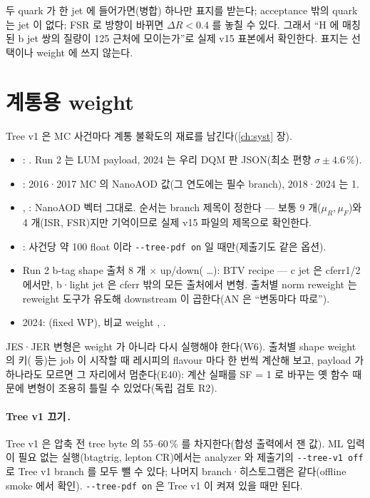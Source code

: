 \begin{note}[표지의 한계]
두 quark 가 한 jet 에 들어가면(병합) 하나만 표지를 받는다; acceptance 밖의 quark 는 jet 이 없다; FSR 로 방향이 바뀌면 $\Delta R<0.4$ 를 놓칠 수 있다.
그래서 ``H 에 매칭된 b jet 쌍의 질량이 125\GeV{} 근처에 모이는가''로 실제 v15 표본에서 확인한다. 표지는 선택이나 weight 에
쓰지 않는다.
\end{note}

\section{계통용 weight}\label{sec:reco-weights}
Tree v1 은 MC 사건마다 계통 불확도의 재료를 남긴다(\ref{ch:syst} 장).
\begin{itemize}
\item {}: . Run 2 는 LUM payload, 2024 는 우리 DQM 판 JSON(최소 편향 $\sigma\pm4.6\,\%$).
\item {}: 2016·2017 MC 의 NanoAOD 값(그 연도에는 필수 branch), 2018·2024 는 1.
\item {}, : NanoAOD 벡터 그대로. 순서는 branch 제목이 정한다 — 보통 9 개($\mu_R,\mu_F$)와 4 개(ISR, FSR)지만 기억이므로
      실제 v15 파일의 제목으로 확인한다\tagopen.
\item {}: 사건당 약 100 float 이라 \texttt{-{}-tree-pdf on} 일 때만(제출기도 같은 옵션).
\item Run 2 b-tag shape 출처 8 개 $\times$ up/down( …): BTV recipe — c jet 은 cferr1/2 에서만, b·light jet 은 cferr 밖의 모든 출처에서
      변형. 출처별 norm reweight 는 reweight 도구가 유도해 downstream 이 곱한다(AN 은 ``변동마다 따로'').
\item 2024: (fixed WP), 비교 weight , .
\end{itemize}
JES·JER 변형은 weight 가 아니라 다시 실행해야 한다(W6). 출처별 shape weight 의 키( 등)는 job 이 시작할 때 레시피의
flavour 마다 한 번씩 계산해 보고, payload 가 하나라도 모르면 그 자리에서 멈춘다(E40)\tagtest{}: 계산 실패를 SF = 1 로 바꾸는 옛 함수
때문에 변형이 조용히 틀릴 수 있었다(독립 검토 R2).

\paragraph{Tree v1 끄기\,\tagimpl\tagtest.} Tree v1 은 압축 전 tree byte 의 55–60\,\% 를 차지한다(합성 출력에서 잰 값). ML 입력이 필요
없는 실행(btagtrig, lepton CR)에서는 analyzer 와 제출기의 \texttt{-{}-tree-v1 off} 로 Tree v1 branch 를 모두 뺄 수 있다; 나머지 branch·히스토그램은
같다(offline smoke 에서 확인). \texttt{-{}-tree-pdf on} 은 Tree v1 이 켜져 있을 때만 된다.

